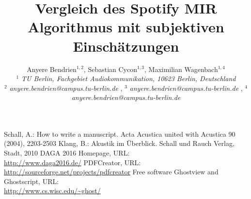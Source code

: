 \documentclass[a4paper, 10pt, twocolumn]{article}
\begin{document}
\date{}                                         %

\title{\vspace{-8mm}\textbf{\large
Vergleich des Spotify MIR Algorithmus mit subjektiven Einschätzungen }}

\author{
Anyere Bendrien$^{1,2}$, Sebastian Cycon$^{1,3}$, Maximilian Wagenbach$^{1,4}$\\
$^{1}$ \emph{\small TU Berlin, Fachgebiet Audiokommunikation, 10623 Berlin,
Deutschland
} \\
$^{2}$ \emph{\small anyere.bendrien@campus.tu-berlin.de
},
$^{3}$ \emph{\small anyere.bendrien@campus.tu-berlin.de
},
$^{4}$ \emph{\small anyere.bendrien@campus.tu-berlin.de
} } \maketitle
\thispagestyle{empty}           %





\begin{thebibliography}{5}
Schall, A.: How to write a manuscript. Acta Acustica united with
Acustica 90 (2004), 2203-2503
Klang, B.: Akustik im Überblick. Schall und Rauch Verlag, Stadt,
2010
DAGA 2016 Homepage, URL:\\
\url{http://www.daga2016.de/}
PDFCreator, URL:\\
\url{http://sourceforge.net/projects/pdfcreator}
Free software Ghostview and Ghostscript, URL:\\
\url{http://www.cs.wisc.edu/~ghost/}
\end{thebibliography}
\end{document}
